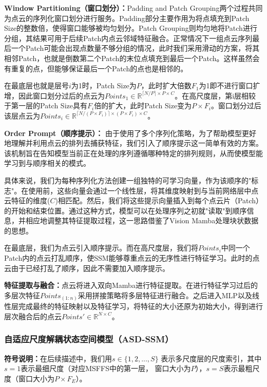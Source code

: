 \documentclass[preprint,12pt]{elsarticle}
\begin{document}
\textbf{Window Partitioning（窗口划分）：}Padding and Patch Grouping两个过程共同为点云的序列化窗口划分进行服务。Padding部分主要作用为将点填充到Patch Size的整数倍，使得窗口能够被均匀划分。Patch Grouping则均匀地将Patch进行分组，其结果可用于后续Patch内点云邻域特征融合。正常情况下一组点云序列最后一个Patch可能会出现点数量不够分组的情况，此时我们采用滑动的方案，将其相邻Patch，也就是倒数第二个Patch的末位点填充到最后一个Patch。这样虽然会有重复的点，但能够保证最后一个Patch的点也是相邻的。

在最底层也就是层号$i$为1时，Patch Size为$P$，此时扩大倍数$F_1$为1即不进行窗口扩增，因此窗口划分过后的点云为$Points_{1}\in\mathbb{R}^{\lceil N/P \rceil\times P \times C}$。在高尺度层，第i层相较于第一层的Patch Size具有$F_{i}$倍的扩大，此时Patch Size变为$P\times F_{i}$。窗口划分过后该层点云为$Points_{i}\in\mathbb{R}^{\lceil N/(P\times F_{i}) \rceil\times (P\times F_{i}) \times C}$。

\textbf{Order Prompt（顺序提示）：}
由于使用了多个序列化策略，为了帮助模型更好地理解并利用点云的排列去捕获特征，我们引入了顺序提示这一简单有效的方案。该机制旨在告知模型当前正在处理的序列遵循哪种特定的排列规则，从而使模型能学习到与顺序相关的模式。

具体来说，我们为每种序列化方法创建一组独特的可学习向量，作为该顺序的"标志"。在使用前，这些向量会通过一个线性层，将其维度映射到与当前网络层中点云特征的维度($C$)相匹配。然后，我们将这些提示向量插入到每个点云片（Patch）的开始和结束位置。通过这种方式，模型可以在处理序列之初就"读取"到顺序信息，并相应地调整其特征提取过程，这一思路借鉴了Vision Mamba\cite{VisionMamba}处理块状数据的思想。

在最底层，我们为点云引入顺序提示。而在高尺度层，我们将$Points_{i}$中同一个Patch内的点云打乱顺序，使SSM能够尊重点云的无序性进行特征学习。此时的点云由于已经打乱了顺序，因此不需要加入顺序提示。

\textbf{特征提取与融合：}点云将进入双向Mamba进行特征提取。在进行特征学习过后的多层次特征$Points_{(1:n)}$采用拼接策略将多层特征进行融合。之后进入MLP以及线性层完成最终的特征映射以及特征学习，将特征的大小还原为初始大小，得到进行层次融合后的点云$Points'\in\mathbb{R}^{N\times{C}}$。

\subsubsection{自适应尺度解耦状态空间模型（ASD-SSM）}
\textbf{符号说明：}在后续描述中，我们用$s \in \{1, 2, ..., S\}$
表示多尺度层的尺度索引，其中$s=1$表示最细尺度（对应MSFFS中的第一层，
窗口大小为$P$），$s=S$表示最粗尺度（窗口大小为$P \times F_E$）。
\end{document}
